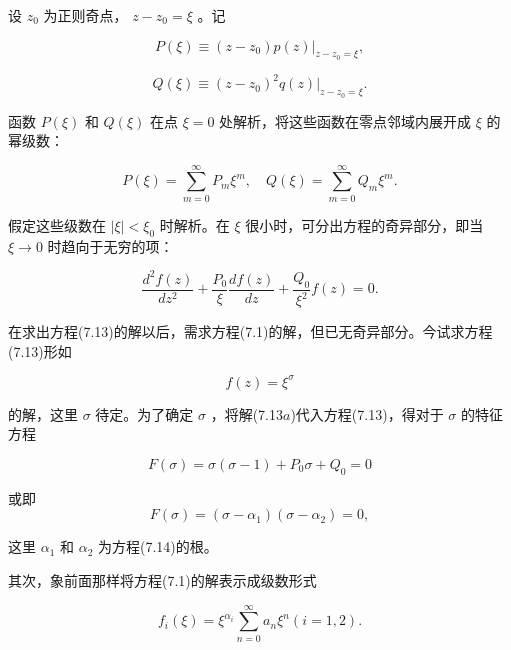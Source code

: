 设 $z_0$ 为正则奇点， $z - z_0 = \xi$ 。记

\begin{equation*}
P (\xi) \equiv (z - z _ {0}) p (z) | _ {z - z _ {0} = \xi},
\end{equation*}

\begin{equation*}
Q (\xi) \equiv (z - z _ {0}) ^ {2} q (z) | _ {z - z _ {0} = \xi}.
\end{equation*}

函数 $P(\xi)$ 和 $Q(\xi)$ 在点 $\xi = 0$ 处解析，将这些函数在零点邻域内展开成 $\xi$ 的幂级数：

\begin{equation*}
P (\xi) = \sum_ {m = 0} ^ {\infty} P _ {m} \xi^ {m}, \quad Q (\xi) = \sum_ {m = 0} ^ {\infty} Q _ {m} \xi^ {m}.
\end{equation*}

假定这些级数在 $|\xi| < \xi_0$ 时解析。在 $\xi$ 很小时，可分出方程的奇异部分，即当 $\xi \to 0$ 时趋向于无穷的项：

\begin{equation*}
\frac {d ^ {2} f (z)}{d z ^ {2}} + \frac {P _ {0}}{\xi} \frac {d f (z)}{d z} + \frac {Q _ {0}}{\xi^ {2}} f (z) = 0.\tag{7.13}
\end{equation*}

在求出方程(7.13)的解以后，需求方程(7.1)的解，但已无奇异部分。今试求方程(7.13)形如

\begin{equation*}
f (z) = \xi^ {\sigma}\tag{7.13a}
\end{equation*}

的解，这里 $\sigma$ 待定。为了确定 $\sigma$ ，将解(7.13$a$)代入方程(7.13)，得对于 $\sigma$ 的特征方程

\begin{equation*}
F (\sigma) = \sigma (\sigma - 1) + P _ {0} \sigma + Q _ {0} = 0\tag{7.14}
\end{equation*}

或即
\begin{equation*}
F (\sigma) = \left(\sigma - \alpha_ {1}\right) \left(\sigma - \alpha_ {2}\right) = 0,
\end{equation*}

这里 $\alpha_{1}$ 和 $\alpha_{2}$ 为方程(7.14)的根。

其次，象前面那样将方程(7.1)的解表示成级数形式

\begin{equation*}
f _ {i} (\xi) = \xi^ {\alpha_ {i}} \sum_ {n = 0} ^ {\infty} a _ {n} \xi^ {n} (i = 1, 2).\tag{7.15}
\end{equation*}

